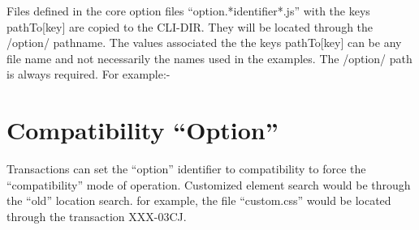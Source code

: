 \documentclass[letterpaper,10pt,english]{sphinxmanual}
\begin{document}
\begin{sphinxVerbatim}[commandchars=\\\{\}]
        
       
              
      
\end{sphinxVerbatim}

Files defined in the core option files “option.*identifier*.js” with the keys pathTo{[}key{]} are copied to the CLI-DIR. They will be located through the /option/ pathname. The values associated the the keys pathTo{[}key{]} can be any file name and not necessarily the names used in the examples. The /option/ path is always required. For example:-

\begin{sphinxVerbatim}[commandchars=\\\{\}]
      
 
\end{sphinxVerbatim}


\section{Compatibility “Option”}
\label{\detokenize{TN202002:compatibility-option}}
Transactions can set the “option” identifier to compatibility to force the “compatibility” mode of operation. Customized element search would be through the “old” location search. for example, the file “custom.css” would be located through the transaction XXX-03CJ.
\end{document}
